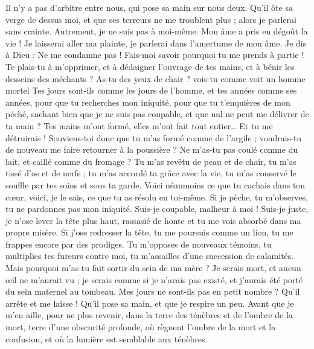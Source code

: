 \begin{multicols}{2}
Il n'y a pas d'arbitre entre nous, qui pose sa main sur nous deux.
Qu'il ôte sa verge de dessus moi, et que ses terreurs ne me troublent plus ;
alors je parlerai sans crainte. Autrement, je ne suis pas à moi-même.
\VerseOne{}Mon âme a pris en dégoût la vie ! Je laisserai aller ma plainte, je parlerai dans l'amertume de mon âme.
Je dis à Dieu : Ne me condamne pas ! Fais-moi savoir pourquoi tu me prends à partie !
Te plais-tu à m'opprimer, et à dédaigner l'ouvrage de tes mains, et à bénir les desseins des méchants ?
As-tu des yeux de chair ? vois-tu comme voit un homme mortel
Tes jours sont-ils comme les jours de l'homme, et tes années comme ses années,
pour que tu recherches mon iniquité, pour que tu t'enquières de mon péché,
sachant bien que je ne suis pas coupable, et que nul ne peut me délivrer de ta main ?
Tes mains m'ont formé, elles m'ont fait tout entier… Et tu me détruirais !
Souviens-toi donc que tu m'as formé comme de l'argile ; voudrais-tu de nouveau me faire retourner à la poussière ?
Ne m'as-tu pas coulé comme du lait, et caillé comme du fromage ?
Tu m'as revêtu de peau et de chair, tu m'as tissé d'os et de nerfs ;
tu m'as accordé ta grâce avec la vie, tu m'as conservé le souffle par tes soins et sous ta garde.
Voici néanmoins ce que tu cachais dans ton cœur, voici, je le sais, ce que tu as résolu en toi-même.
Si je pèche, tu m'observes, tu ne pardonnes pas mon iniquité.
Suis-je coupable, malheur à moi ! Suis-je juste, je n'ose lever la tête plus haut, rassasié de honte et tu me vois absorbé dans ma propre misère.
Si j'ose redresser la tête, tu me poursuis comme un lion, tu me frappes encore par des prodiges.
Tu m'opposes de nouveaux témoins, tu multiplies tes fureurs contre moi, tu m'assailles d'une succession de calamités.
Mais pourquoi m'as-tu fait sortir du sein de ma mère ? Je serais mort, et aucun œil ne m'aurait vu ;
je serais comme si je n'avais pas existé, et j'aurais été porté du sein maternel au tombeau.
Mes jours ne sont-ils pas en petit nombre ? Qu'il arrête et me laisse ! Qu'il pose sa main, et que je respire un peu.
Avant que je m'en aille, pour ne plus revenir, dans la terre des ténèbres et de l'ombre de la mort,
terre d'une obscurité profonde, où règnent l'ombre de la mort et la confusion, et où la lumière est semblable aux ténèbres.

\end{multicols}
